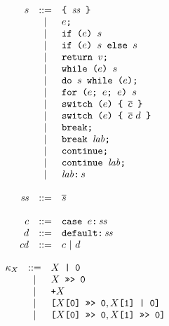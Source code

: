 \documentclass{article}
\newcommand{\seq}[1]{\overline{{#1}}}
\newcommand{\mathjs}[1]{\mbox{\texttt{{#1}}}}
\newcommand{\return}[1]{\mathjs{return }{#1}\mathjs{;}}
\newcommand{\while}[2]{\mathjs{while (}{#1}\mathjs{) }{#2}}
\newcommand{\dowhile}[2]{\mathjs{do }{#1}\mathjs{ while (}{#2}\mathjs{);}}
\newcommand{\for}[4]{\mathjs{for (}{#1}\mathjs{; }{#2}\mathjs{; }{#3}\mathjs{) }{#4}}
\newcommand{\switch}[2]{\mathjs{switch (}{#1}\mathjs{) \{ }{#2}\mathjs{ \}}}
\newcommand{\brk}{\mathjs{break;}}
\newcommand{\brkl}[1]{\mathjs{break }{#1}\mathjs{;}}
\newcommand{\cont}{\mathjs{continue;}}
\newcommand{\contl}[1]{\mathjs{continue }{#1}\mathjs{;}}
\newcommand{\lab}[2]{{#1}\mathjs{:}\,{#2}}
\newcommand{\ifthen}[2]{\mathjs{if (}{#1}\mathjs{) }{#2}}
\newcommand{\ifthenelse}[3]{\mathjs{if (}{#1}\mathjs{) }{#2}\mathjs{ else }{#3}}
\newcommand{\block}[1]{\mathjs{\{ }{#1}\mathjs{ \}}}
\newcommand{\getprop}[2]{{#1}\mathjs{[}{#2}\mathjs{]}}
\newcommand{\longlong}[2]{\mathjs{[}{#1},{#2}\mathjs{]}}
\newcommand{\toint}[1]{{#1}\mathjs{ | 0}}
\newcommand{\touint}[1]{{#1}\mathjs{ >>> 0}}
\begin{document}
\[
\begin{array}{rcl}
s & ::= & \block{\mathit{ss}} \\
  &  |  & e\mathjs{;} \\
  &  |  & \ifthen{e}{s} \\
  &  |  & \ifthenelse{e}{s}{s} \\
  &  |  & \return{v} \\
  &  |  & \while{e}{s} \\
  &  |  & \dowhile{s}{e} \\
  &  |  & \for{e}{e}{e}{s} \\
  &  |  & \switch{e}{\seq{c}} \\
  &  |  & \switch{e}{\seq{c}\ d} \\
  &  |  & \brk \\
  &  |  & \brkl{\mathit{lab}} \\
  &  |  & \cont \\
  &  |  & \contl{\mathit{lab}} \\
  &  |  & \lab{\mathit{lab}}{s} \\
\\
\mathit{ss} & ::= & \seq{s} \\
\\
c & ::= & \mathjs{case }e\mathjs{:}\,\mathit{ss} \\
d & ::= & \mathjs{default:}\,\mathit{ss} \\
\mathit{cd} & ::= & c ~|~ d \\
\end{array}
\]

\[
\begin{array}{rcl}
\kappa_X & ::= & \toint{X} \\
         &  |  & \touint{X} \\
         &  |  & \mathjs{+}X \\
         &  |  & \longlong{\touint{\getprop{X}{\mathjs{0}}}}{\toint{\getprop{X}{\mathjs{1}}}} \\
         &  |  & \longlong{\touint{\getprop{X}{\mathjs{0}}}}{\touint{\getprop{X}{\mathjs{1}}}} \\
\end{array}
\]
\end{document}
